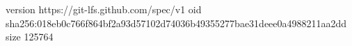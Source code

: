 version https://git-lfs.github.com/spec/v1
oid sha256:018eb0c766f864bf2a93d57102d74036b49355277bae31deee0a4988211aa2dd
size 125764
